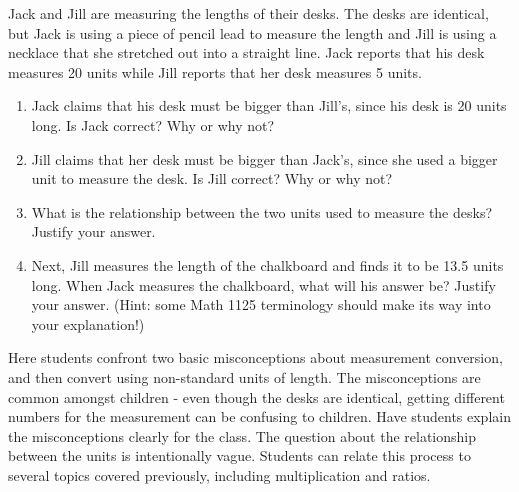 \documentclass[handout]{ximera}
\begin{document}
\begin{problem}
    Jack and Jill are measuring the lengths of their desks.  The desks are identical, but Jack is using a piece of pencil lead to measure the length and Jill is using a necklace that she stretched out into a straight line.  Jack reports that his desk measures 20 units while Jill reports that her desk measures 5 units.
    \begin{enumerate}
        \item Jack claims that his desk must be bigger than Jill's, since his desk is 20 units long.  Is Jack correct?  Why or why not?
        \item Jill claims that her desk must be bigger than Jack's, since she used a bigger unit to measure the desk.  Is Jill correct?  Why or why not?
        \item What is the relationship between the two units used to measure the desks?  Justify your answer.
        \item Next, Jill measures the length of the chalkboard and finds it to be 13.5 units long.  When Jack measures the chalkboard, what will his answer be?  Justify your answer.  (Hint: some Math 1125 terminology should make its way into your explanation!)
    \end{enumerate}
    
    \begin{instructorNotes}
    Here students confront two basic misconceptions about measurement conversion, and then convert using non-standard units of length.  The misconceptions are common amongst children - even though the desks are identical, getting different numbers for the measurement can be confusing to children.  Have students explain the misconceptions clearly for the class.  The question about the relationship between the units is intentionally vague.  Students can relate this process to several topics covered previously, including multiplication and ratios.
    \end{instructorNotes}
\end{problem}
\end{document}
